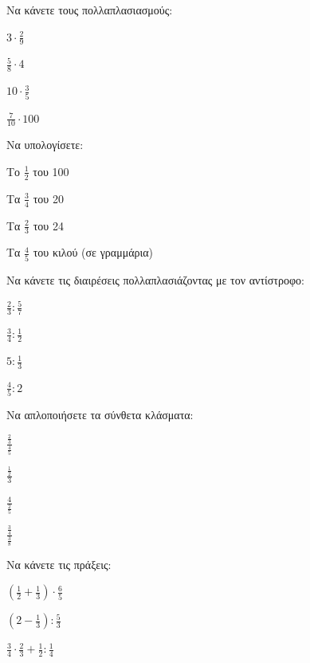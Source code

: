 \documentclass[11pt,a4paper,modern]{FFExercises}
\begin{document}
    \askhsh Να κάνετε τους πολλαπλασιασμούς:
    \begin{alist}
        \item $3 \cdot \frac{2}{9}$
        \item $\frac{5}{8} \cdot 4$
        \item $10 \cdot \frac{3}{5}$
        \item $\frac{7}{10} \cdot 100$
    \end{alist}

    \askhsh Να υπολογίσετε:
    \begin{alist}
        \item Το $\frac{1}{2}$ του 100
        \item Τα $\frac{3}{4}$ του 20
        \item Τα $\frac{2}{3}$ του 24
        \item Τα $\frac{4}{5}$ του κιλού (σε γραμμάρια)
    \end{alist}

    \askhsh Να κάνετε τις διαιρέσεις πολλαπλασιάζοντας με τον αντίστροφο:
    \begin{alist}
        \item $\frac{2}{3} : \frac{5}{7}$
        \item $\frac{3}{4} : \frac{1}{2}$
        \item $5 : \frac{1}{3}$
        \item $\frac{4}{5} : 2$
    \end{alist}

    \askhsh Να απλοποιήσετε τα σύνθετα κλάσματα:
    \begin{alist}
        \item $\frac{\frac{2}{3}}{\frac{4}{5}}$
        \item $\frac{\frac{1}{2}}{3}$
        \item $\frac{4}{\frac{2}{5}}$
        \item $\frac{\frac{3}{4}}{\frac{3}{8}}$
    \end{alist}

    \askhsh Να κάνετε τις πράξεις:
    \begin{alist}
        \item $\left( \frac{1}{2} + \frac{1}{3} \right) \cdot \frac{6}{5}$
        \item $\left( 2 - \frac{1}{3} \right) : \frac{5}{3}$
        \item $\frac{3}{4} \cdot \frac{2}{3} + \frac{1}{2} : \frac{1}{4}$
    \end{alist}
\end{document}
